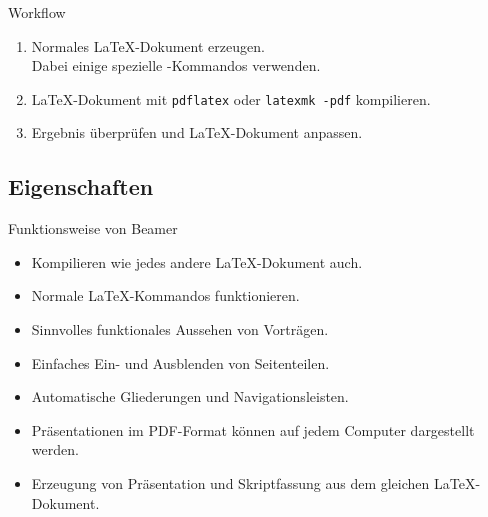 \begin{Frame}{Workflow}
  \begin{enumerate}
    \item Normales \LaTeX-Dokument erzeugen.\\
      Dabei einige spezielle \beamer-Kommandos verwenden.
    \item \LaTeX-Dokument mit \lstinline-pdflatex- oder \lstinline|latexmk -pdf| kompilieren.
    \item Ergebnis überprüfen und \LaTeX-Dokument anpassen.
  \end{enumerate}
\end{Frame}

\subsection{Eigenschaften}

\begin{Frame}{Funktionsweise von Beamer}
  \begin{itemize}
    \item Kompilieren wie jedes andere \LaTeX-Dokument auch.
    \item Normale \LaTeX-Kommandos funktionieren.
    \item Sinnvolles funktionales Aussehen von Vorträgen.
    \item Einfaches Ein- und Ausblenden von Seitenteilen.
    \item Automatische Gliederungen und Navigationsleisten.
    \item Präsentationen im PDF-Format können auf jedem Computer dargestellt werden.
    \item Erzeugung von Präsentation und Skriptfassung aus dem gleichen \LaTeX-Dokument.
  \end{itemize}
\end{Frame}


